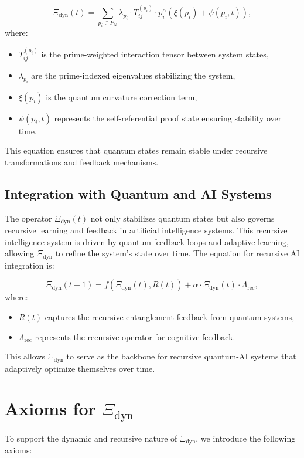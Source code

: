 \documentclass[12pt]{article}
\begin{document}
\[
\Xi_{\text{dyn}}(t) = \sum_{p_i \in P_N} \lambda_{p_i} \cdot T_{ij}^{(p_i)} \cdot p_i^{\alpha} \left( \xi(p_i) + \psi(p_i, t) \right),
\]
where:
\begin{itemize}
    \item $T_{ij}^{(p_i)}$ is the prime-weighted interaction tensor between system states,
    \item $\lambda_{p_i}$ are the prime-indexed eigenvalues stabilizing the system,
    \item $\xi(p_i)$ is the quantum curvature correction term,
    \item $\psi(p_i, t)$ represents the self-referential proof state ensuring stability over time.
\end{itemize}

This equation ensures that quantum states remain stable under recursive transformations and feedback mechanisms.

\subsection{Integration with Quantum and AI Systems}
The operator $\Xi_{\text{dyn}}(t)$ not only stabilizes quantum states but also governs recursive learning and feedback in artificial intelligence systems. This recursive intelligence system is driven by quantum feedback loops and adaptive learning, allowing $\Xi_{\text{dyn}}$ to refine the system's state over time. The equation for recursive AI integration is:

\[
\Xi_{\text{dyn}}(t+1) = f(\Xi_{\text{dyn}}(t), R(t)) + \alpha \cdot \Xi_{\text{dyn}}(t) \cdot \Lambda_{\text{rec}},
\]
where:
\begin{itemize}
    \item $R(t)$ captures the recursive entanglement feedback from quantum systems,
    \item $\Lambda_{\text{rec}}$ represents the recursive operator for cognitive feedback.
\end{itemize}

This allows $\Xi_{\text{dyn}}$ to serve as the backbone for recursive quantum-AI systems that adaptively optimize themselves over time.

\section{Axioms for $\Xi_{\text{dyn}}$}
To support the dynamic and recursive nature of $\Xi_{\text{dyn}}$, we introduce the following axioms:
\end{document}
